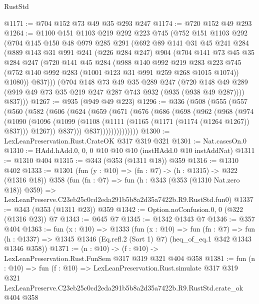 \begin{lexlean}{RustStd}
\begin{coremodule}
@1171 := @704 @152 @73 @49 @35 @293 @247
@1174 := @720 @152 @49 @293
@1264 := @1100
    @151
    @1103
    @219
    @292
    @223
    @745
    (@752
      @151
      @1103
      @292
      (@704
        @145
        @150
        @48
        @979
        @285
        @291
        (@692
          @89
          @141
          @31
          @45
          @241
          @284
          (@889
            @143
            @31
            @991
            @241
            (@226 @284 @247)
            @904
            (@704
              @141
              @73
              @45
              @35
              @284
              @247
              (@720
                @141
                @45
                @284
                (@988
                  @140
                  @992
                  @219
                  @283
                  @223
                  @745
                  (@752 @140 @992 @283 (@1001 @123 @31 @991 @259 @268 @1015 @1074))
                  @1080))
              @837)))
        (@704
          @148
          @73
          @49
          @35
          @289
          @247
          (@720 @148 @49 @289 (@919 @49 @73 @35 @219 @247 @287 @743 @932 (@935 (@938 @49 @287))))
          @837)))
@1267 := @935 (@949 @49 @223)
@1296 := @336
    (@508
      (@555
        (@557
          (@560
            (@582
              (@606
                (@624
                  (@659
                    (@671
                      (@676
                        (@686
                          (@698
                            (@962
                              (@968
                                (@974
                                  (@1090
                                    (@1096
                                      (@1099
                                        (@1108
                                          (@1111 (@1165 (@1171 (@1174 (@1264 @1267)) @837)))
                                          @1267))
                                      @837)))
                                @837))))))))))))))
@1300 := LexLeanPreservation.Rust.CrateOK @317 @319 @321
@1301 := Nat.casesOn.{0}
@1310 := HAdd.hAdd.{0, 0, 0} @10 @10 @10 (instHAdd.{0} @10 instAddNat)
@1311 := @1310 @404
@1315 := @343 (@353 (@1311 @18)) @359
@1316 := @1310 @402
@1333 := @1301
    (fun (y : @10) => (fn : @7) -> (h : @1315) -> @322 (@1316 @18))
    @358
    (fun (fn : @7) =>
    fun (h : @343 (@353 (@1310 Nat.zero @18)) @359) =>
    LexLeanPreserve.C23eb25c0cd2eda291b5b8a2d35a7422b.R9.RustStd.fun0)
@1337 := @343 (@353 (@1311 @23)) @359
@1342 := Option.noConfusion.{0, 0} (@322 (@1316 @23)) @7
@1343 := @645 @7
@1345 := @1342 @1343 @7
@1346 := @357 @404
@1363 := fun (x : @10) =>
  @1333
    (fun (x : @10) =>
    fun (fn : @7) =>
    fun (h : @1337) => @1345 @1346 (Eq.refl.{2} (Sort 1) @7) (heq_of_eq.{1} @342 @1343 @1346 @358))
@1371 := (n : @10) -> (f : @10) -> LexLeanPreservation.Rust.FunSem @317 @319 @321 @404 @358
@1381 := fun (n : @10) =>
  fun (f : @10) =>
  LexLeanPreservation.Rust.simulate
    @317
    @319
    @321
    LexLeanPreserve.C23eb25c0cd2eda291b5b8a2d35a7422b.R9.RustStd.crate_ok
    @404
    @358
\end{coremodule}
\end{lexlean}
